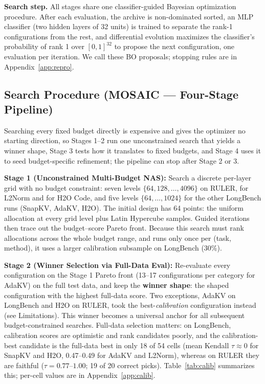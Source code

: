 \documentclass[11pt]{article}
\begin{document}
\textbf{Search step.} All stages share one classifier-guided Bayesian optimization procedure. After each evaluation, the archive is non-dominated sorted, an MLP classifier (two hidden layers of 32 units) is trained to separate the rank-1 configurations from the rest, and differential evolution maximizes the classifier's probability of rank 1 over $[0,1]^{32}$ to propose the next configuration, one evaluation per iteration. We call these BO proposals; stopping rules are in Appendix~\ref{app:repro}.

\subsection{Search Procedure (MOSAIC — Four-Stage Pipeline)}

Searching every fixed budget directly is expensive and gives the optimizer no starting direction, so Stages 1--2 run one unconstrained search that yields a winner shape, Stage 3 tests how it translates to fixed budgets, and Stage 4 uses it to seed budget-specific refinement; the pipeline can stop after Stage 2 or 3.

\textbf{Stage 1 (Unconstrained Multi-Budget NAS):} Search a discrete per-layer grid with no budget constraint: seven levels $\{64,128,\dots,4096\}$ on RULER, for L2Norm and for H2O Code, and five levels $\{64,\dots,1024\}$ for the other LongBench runs (SnapKV, AdaKV, H2O). The initial design has 64 points: the uniform allocation at every grid level plus Latin Hypercube samples. Guided iterations then trace out the budget--score Pareto front. Because this search must rank allocations across the whole budget range, and runs only once per (task, method), it uses a larger calibration subsample on LongBench (30\%).

\textbf{Stage 2 (Winner Selection via Full-Data Eval):} Re-evaluate every configuration on the Stage 1 Pareto front (13--17 configurations per category for AdaKV) on the full test data, and keep the \textbf{winner shape}: the shaped configuration with the highest full-data score. Two exceptions, AdaKV on LongBench and H2O on RULER, took the best-\emph{calibration} configuration instead (see Limitations). This winner becomes a universal anchor for all subsequent budget-constrained searches. Full-data selection matters: on LongBench, calibration scores are optimistic and rank candidates poorly, and the calibration-best candidate is the full-data best in only 18 of 54 cells (mean Kendall $\tau \approx 0$ for SnapKV and H2O, 0.47--0.49 for AdaKV and L2Norm), whereas on RULER they are faithful ($\tau = 0.77$--$1.00$; 19 of 20 correct picks). Table~\ref{tab:calib} summarizes this; per-cell values are in Appendix~\ref{app:calib}.
\end{document}
